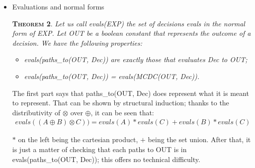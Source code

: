 \documentclass[a4paper,12pt,twoside]{article}
\newtheorem{theorem}{\textsc{Theorem}}
\newtheorem{definition}{\textsc{Definition}}
\begin{document}
\begin{itemize}
\begin{definition}
  MCDC(...) is said to be in normal form if it verifies
  the syntax of <mcdc\_nf> and if only one occurence of each decision can be
  found in the formula.
\end{definition}

Existence of normal form has been proven previously. We have a
property of unicity (modulo commutativity) that is a general property
of these expressions in linear logic:
\begin{theorem}
  \label{thm:truth-table-unicity}
  Two expressions in normal forms are say to represent the same
  truth table if you can reduce one to the other using only the
  commutativity of $\otimes$, $\oplus$, $\with$, $\parr$.

  Then, if an expression returned by BUILD\_MCDC can be reduced to two
  different expressions in normal forms, then these two normals forms
  represent the same truth table.
\end{theorem}

This is a general property of linear logic, that can be proven using
its sequent calculus. The detail of this proof may be found in
Appendix~\ref{ap:proof-truth-table-unicity}.

\item Evaluations and normal forms
\begin{theorem}
  \label{thm:evals-and-paths}
  Let us call evals(EXP) the set of decisions evals in the normal form
  of EXP. Let OUT be a boolean constant that represents the outcome of a
  decision. We have the following properties:
  \begin{itemize}
  \item evals(paths\_to(OUT, Dec)) are exactly those that evaluates Dec to OUT;
  \item evals(paths\_to(OUT, Dec)) = evals(MCDC(OUT, Dec)).
  \end{itemize}
\end{theorem}

The first part says that paths\_to(OUT, Dec) does represent what it is
meant to represent. That can be shown by structural induction; thanks
to the distributivity of $\otimes$ over $\oplus$, it can be seen that:
\begin{align*}
  evals((A \oplus B) \otimes C))
   = evals(A) * evals(C) + evals (B) * evals (C)
\end{align*}

$*$ on the left being the cartesian product, $+$ being the set union.
After that, it is just a matter of checking that each paths to OUT is
in evals(paths\_to(OUT, Dec)); this offers no technical difficulty.


\end{itemize}
\end{document}
